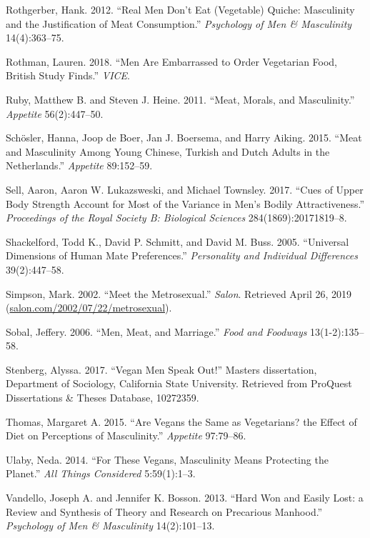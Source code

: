 \documentclass[twoside]{report}
\begin{document}
\begin{multicols*}{2}
\hypertarget{rothgerber}{Rothgerber, Hank. 2012. ``Real Men Don't Eat (Vegetable) Quiche:
Masculinity and the Justification of Meat Consumption.''
\emph{Psychology of Men \& Masculinity} 14(4):363--75.}

\hypertarget{rothman}{Rothman, Lauren. 2018. ``Men Are Embarrassed to Order Vegetarian Food,
British Study Finds.'' \emph{VICE}.}

\hypertarget{ruby}{Ruby, Matthew B. and Steven J. Heine. 2011. ``Meat, Morals, and
Masculinity.'' \emph{Appetite} 56(2):447--50.}

\hypertarget{schosler}{Schösler, Hanna, Joop de Boer, Jan J. Boersema, and Harry Aiking. 2015.
``Meat and Masculinity Among Young Chinese, Turkish and Dutch Adults in
the Netherlands.'' \emph{Appetite} 89:152--59.}

\hypertarget{sell}{Sell, Aaron, Aaron W. Lukazsweski, and Michael Townsley. 2017. ``Cues of
Upper Body Strength Account for Most of the Variance in Men's Bodily
Attractiveness.'' \emph{Proceedings of the Royal Society B: Biological
Sciences} 284(1869):20171819--8.}

\hypertarget{shackelford}{Shackelford, Todd K., David P. Schmitt, and David M. Buss. 2005.
``Universal Dimensions of Human Mate Preferences.'' \emph{Personality
and Individual Differences} 39(2):447--58.}

\hypertarget{simpson}{Simpson, Mark. 2002. ``Meet the Metrosexual.'' \emph{Salon}. Retrieved
April 26, 2019
(\href{http://salon.com/2002/07/22/metrosexual}{salon.com/2002/07/22/metrosexual}).}

\hypertarget{sobal}{Sobal, Jeffery. 2006. ``Men, Meat, and Marriage.'' \emph{Food and
Foodways} 13(1-2):135--58.}

\hypertarget{stenberg}{Stenberg, Alyssa. 2017. ``Vegan Men Speak Out!'' Masters dissertation, Department of Sociology, California State University. Retrieved from ProQuest Dissertations \& Theses Database, 10272359.}
\pagebreak

\hypertarget{thomas}{Thomas, Margaret A. 2015. ``Are Vegans the Same as Vegetarians? the
Effect of Diet on Perceptions of Masculinity.'' \emph{Appetite}
97:79--86.}

\hypertarget{ulaby}{Ulaby, Neda. 2014. ``For These Vegans, Masculinity Means Protecting the
Planet.'' \emph{All Things Considered} 5:59(1):1--3.}

\hypertarget{vandello}{Vandello, Joseph A. and Jennifer K. Bosson. 2013. ``Hard Won and Easily
Lost: a Review and Synthesis of Theory and Research on Precarious
Manhood.'' \emph{Psychology of Men \& Masculinity} 14(2):101--13.}


\end{multicols*}
\end{document}
